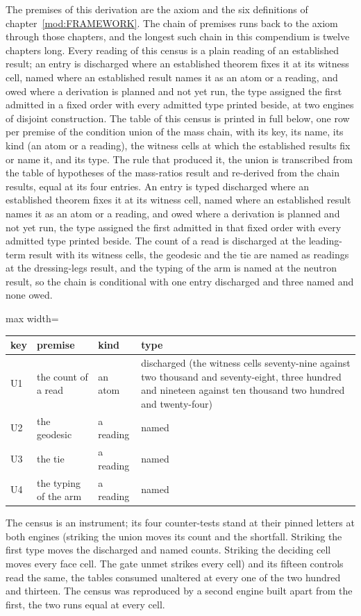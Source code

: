 \begin{chproof}[instrument]
The premises of this derivation are the axiom and the six definitions of chapter~\ref{mod:FRAMEWORK}. The chain of premises runs back to the axiom through those chapters, and the longest such chain in this compendium is twelve chapters long.
Every reading of this census is a plain reading of an established result; an entry is discharged where an established theorem fixes it at its witness cell, named where an established result names it as an atom or a reading, and owed where a derivation is planned and not yet run, the type assigned the first admitted in a fixed order with every admitted type printed beside, at two engines of disjoint construction.
The table of this census is printed in full below, one row per premise of the condition union of the mass chain, with its key, its name, its kind (an atom or a reading), the witness cells at which the established results fix or name it, and its type. The rule that produced it, the union is transcribed from the table of hypotheses of the mass-ratios result and re-derived from the chain results, equal at its four entries. An entry is typed discharged where an established theorem fixes it at its witness cell, named where an established result names it as an atom or a reading, and owed where a derivation is planned and not yet run, the type assigned the first admitted in that fixed order with every admitted type printed beside. The count of a read is discharged at the leading-term result with its witness cells, the geodesic and the tie are named as readings at the dressing-legs result, and the typing of the arm is named at the neutron result, so the chain is conditional with one entry discharged and three named and none owed.
\begin{center}\begin{adjustbox}{max width=\linewidth}\begin{tabular}{llll}\hline key & premise & kind & type \\ \hline U1 & the count of a read & an atom & discharged (the witness cells seventy-nine against two thousand and seventy-eight, three hundred and nineteen against ten thousand two hundred and twenty-four) \\ U2 & the geodesic & a reading & named \\ U3 & the tie & a reading & named \\ U4 & the typing of the arm & a reading & named \\ \hline \end{tabular}\end{adjustbox}\end{center}
The census is an instrument; its four counter-tests stand at their pinned letters at both engines (striking the union moves its count and the shortfall. Striking the first type moves the discharged and named counts. Striking the deciding cell moves every face cell. The gate unmet strikes every cell) and its fifteen controls read the same, the tables consumed unaltered at every one of the two hundred and thirteen. The census was reproduced by a second engine built apart from the first, the two runs equal at every cell.
\end{chproof}
